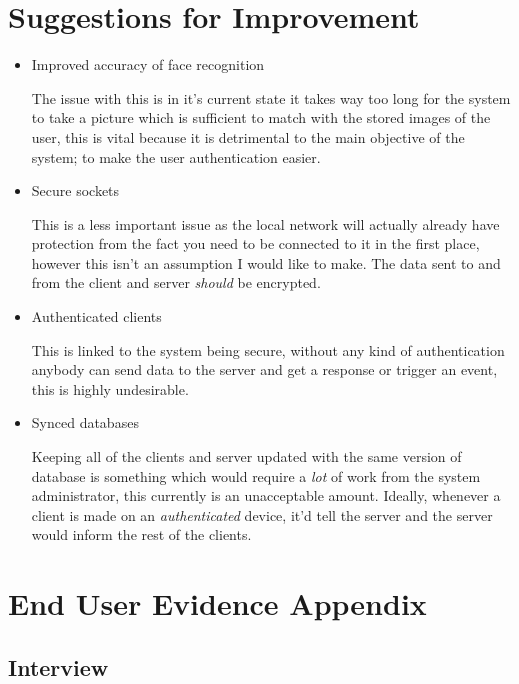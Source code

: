 \documentclass[12pt,a4paper]{report}
\begin{document}
\section{Suggestions for Improvement}

	\begin{itemize}
		\item Improved accuracy of face recognition

			The issue with this is in it's current state it takes way too long for the system to take a picture which is sufficient to match with the stored
			images of the user, this is vital because it is detrimental to the main objective of the system; to make the user authentication easier.

		\item Secure sockets

			This is a less important issue as the local network will actually already have protection from the fact you need to be connected to it in the first place,
			however this isn't an assumption I would like to make. The data sent to and from the client and server \textit{should} be encrypted.

		\item Authenticated clients 

			This is linked to the system being secure, without any kind of authentication anybody can send data to the server and get a response or trigger an event, this
			is highly undesirable.

		\item Synced databases

			Keeping all of the clients and server updated with the same version of database is something which would require a \textit{lot} of work from the system administrator,
			this currently is an unacceptable amount. Ideally, whenever a client is made on an \textit{authenticated} device, it'd tell the server and the server would inform the
			rest of the clients.

	\end{itemize}	

\section{End User Evidence Appendix}

	\subsection{Interview}
\end{document}
